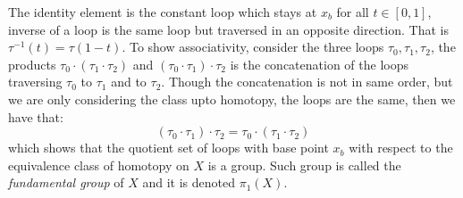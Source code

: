 The identity element is the constant loop which stays at $x_b$ for all $t \in [0,1]$, inverse of a loop is the same loop but traversed in an opposite direction. That is $\tau^{-1}(t) = \tau(1-t)$. To show associativity, consider the three loops $\tau_0, \tau_1,\tau_2$, the products $\tau_0 \cdot (\tau_1 \cdot \tau_2)$ and $(\tau_0 \cdot \tau_1) \cdot \tau_2$ is the concatenation of the loops traversing $\tau_0$ to $\tau_1$ and to $\tau_2$. Though the concatenation is not in same order, but we are only considering the class upto homotopy, the loops are the same, then we have that:
\[
    (\tau_0 \cdot \tau_1) \cdot \tau_2 = \tau_0 \cdot (\tau_1 \cdot \tau_2)
\]
which shows that the quotient set of loops with base point $x_b$ with respect to the equivalence class of homotopy on $X$ is a group. Such group is called the \textit{fundamental group} of $X$ and it is denoted $\pi_1(X)$.

